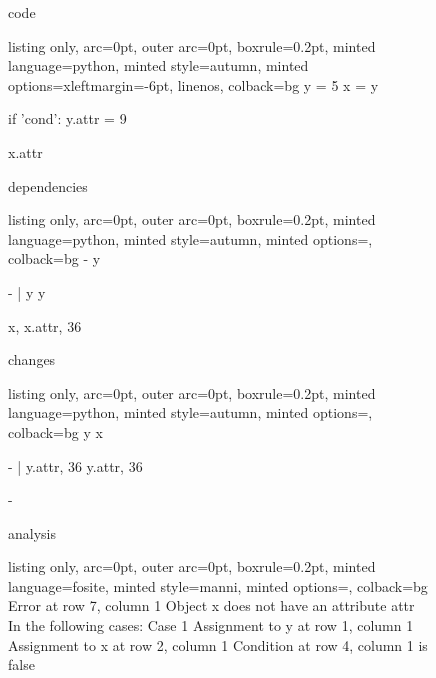 \begin{figure}[!h]
 \begin{minipage}{0.32\textwidth}
 code
 \vspace{2pt}
  \begin{tcblisting}{listing only, 
    arc=0pt,
    outer arc=0pt, 
    boxrule=0.2pt,
    minted language=python,
    minted style=autumn,
    minted options={xleftmargin=-6pt, linenos},
    colback=bg }
y = 5
x = y

if 'cond':
  y.attr = 9

x.attr
\end{tcblisting}
 \end{minipage}
 \begin{minipage}{0.32\textwidth}
 dependencies
  \begin{tcblisting}{listing only, 
    arc=0pt,
    outer arc=0pt, 
    boxrule=0.2pt,
    minted language=python,
    minted style=autumn,
    minted options={},
    colback=bg }
-
y

- | y
    y

x, x.attr, 36
\end{tcblisting}
 \end{minipage}
 \begin{minipage}{0.32\textwidth}
 changes
  \begin{tcblisting}{listing only, 
    arc=0pt,
    outer arc=0pt, 
    boxrule=0.2pt,
    minted language=python,
    minted style=autumn,
    minted options={},
    colback=bg }
y
x

- | y.attr, 36
    y.attr, 36

-
\end{tcblisting}
 \end{minipage}
 \begin{minipage}{\textwidth}
 \vspace{4pt}
 analysis
  \begin{tcblisting}{listing only, 
    arc=0pt,
    outer arc=0pt, 
    boxrule=0.2pt,
    minted language=fosite,
    minted style=manni,
    minted options={},
    colback=bg }
Error at row 7, column 1
  Object x does not have an attribute attr
  In the following cases:
  Case 1
    Assignment to y at row 1, column 1
    Assignment to x at row 2, column 1
    Condition at row 4, column 1 is false
\end{tcblisting}
 \end{minipage}
 \label{lst:aliasing}
\end{figure}